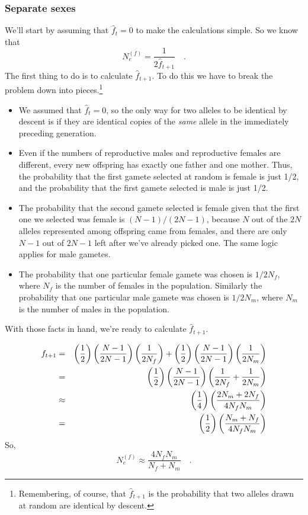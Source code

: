 \subsubsection*{Separate sexes}

We'll start by assuming that $\hat f_t = 0$ to make the calculations
simple. So we know that
\[
N_e^{(f)} = \frac{1}{2\hat f_{t+1}} \quad .
\]
The first thing to do is to calculate $\hat f_{t+1}$. To do this we
have to break the problem down into pieces.\footnote{Remembering, of
course, that $\hat f_{t+1}$ is the probability that two alleles drawn
at random are identical by descent.}

\begin{itemize}

\item We assumed that $\hat f_t = 0$, so the only way for two alleles
to be identical by descent is if they are identical copies of the {\it
same\/} allele in the immediately preceding generation.

\item Even if the numbers of reproductive males and reproductive
  females are different, every new offspring has exactly one father
  and one mother. Thus, the probability that the first gamete selected
  at random is female is just 1/2, and the probability that the first
  gamete selected is male is just 1/2.

\item The probability that the second gamete selected is female given
  that the first one we selected was female is $(N-1)/(2N-1)$, because
  $N$ out of the $2N$ alleles represented among offspring came from
  females, and there are only $N-1$ out of $2N-1$ left after we've
  already picked one. The same logic applies for male gametes.

\item The probability that one particular female gamete was chosen is
  $1/2N_f$, where $N_f$ is the number of females in the
  population. Similarly the probability that one particular male
  gamete was chosen is $1/2N_m$, where $N_m$ is the number of males in
  the population.

\end{itemize}

\noindent With those facts in hand, we're ready to calculate $\hat
f_{t+1}$.

\begin{eqnarray*}
f_{t+1} &=& \left(\frac{1}{2}\right) \left(\frac{N-1}{2N-1}\right)
            \left(\frac{1}{2N_f}\right) +
            \left(\frac{1}{2}\right) \left(\frac{N-1}{2N-1}\right)
            \left(\frac{1}{2N_m}\right) \\
        &=& \left(\frac{1}{2}\right) \left(\frac{N-1}{2N-1}\right)
            \left(\frac{1}{2N_f} + \frac{1}{2N_m}\right) \\
        &\approx& \left(\frac{1}{4}\right)
            \left(\frac{2N_m + 2N_f}{4N_fN_m}\right) \\
        &=& \left(\frac{1}{2}\right)
            \left(\frac{N_m + N_f}{4N_fN_m}\right)
\end{eqnarray*}
So,
\[
N_e^{(f)} \approx \frac{4N_fN_m}{N_f + N_m} \quad .
\]

